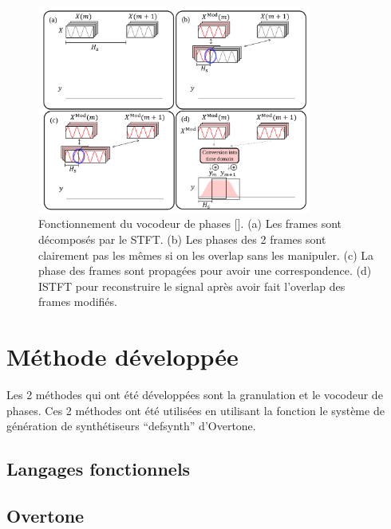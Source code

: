 \documentclass[letterpaper]{article}
\begin{document}
\begin{figure}[h]
    \centerline{\includegraphics[width=9cm]{res/phasevocoder.png}}
    \caption{\label{fig:phasevocoder}
      Fonctionnement du vocodeur de phases [\cite{TSMreview}]. (a) Les frames sont décomposés par le STFT. (b) Les phases des 2 frames sont clairement pas les mêmes si on les overlap sans les manipuler. (c) La phase des frames sont propagées pour avoir une correspondence. (d) ISTFT pour reconstruire le signal après avoir fait l'overlap des frames modifiés.}
  \end{figure}


  
\section{Méthode développée}

Les 2 méthodes qui ont été développées sont la granulation et le vocodeur de phases.
Ces 2 méthodes ont été utilisées en utilisant la fonction le système de génération de
synthétiseurs ``defsynth'' d'Overtone.

\subsection{Langages fonctionnels}

\subsection{Overtone}

\end{document}
